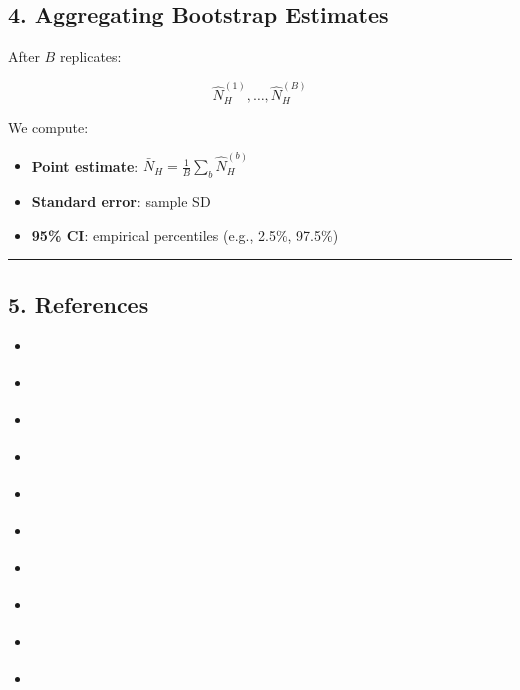 \documentclass[
  12pt,
  letterpaper,
  DIV=11,
  numbers=noendperiod]{scrartcl}
\theoremstyle{plain}
\theoremstyle{definition}
\begin{document}
\subsection{4. Aggregating Bootstrap
Estimates}\label{aggregating-bootstrap-estimates}

After \(B\) replicates:

\[\hat{N}_H^{(1)}, \dots, \hat{N}_H^{(B)}\]

We compute:

\begin{itemize}
\item
  \textbf{Point estimate}:
  \(\bar{N}_H = \frac{1}{B} \sum_b \hat{N}_H^{(b)}\)
\item
  \textbf{Standard error}: sample SD
\item
  \textbf{95\% CI}: empirical percentiles (e.g., 2.5\%, 97.5\%)
\end{itemize}

\begin{center}\rule{0.5\linewidth}{0.5pt}\end{center}

\subsection{5. References}\label{references-1}

\begin{itemize}
\item
  \textcite{feeh16-generaling}
\item
  \textcite{salf06-variance}
\item
  \textcite{gile11-inference}
\item
  \textcite{volz08-rds}
\item
  \textcite{malt15-estimating}
\item
  \textcite{yauc22-neighboot}
\item
  \textcite{weir12-comparison}
\item
  \textcite{salg06-variance}
\item
  \textcite{rust96-rescaled}
\item
  \textcite{rao88-resampling}
\end{itemize}
\end{document}
